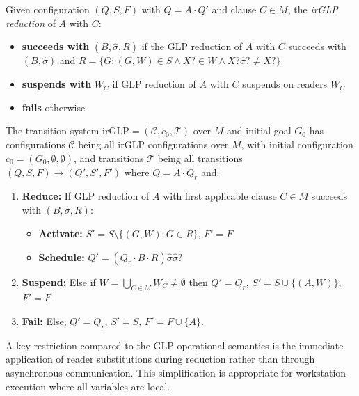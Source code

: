 \documentclass[runningheads,thm-restate]{llncs}
\begin{document}
\begin{definition}
Given configuration $(Q, S, F)$ with $Q = A\cdot Q'$ and clause $C \in M$, the \emph{irGLP reduction} of $A$ with $C$:
\begin{itemize}
\item \textbf{succeeds with} $(B, \hat\sigma, R)$ if the GLP reduction of $A$ with $C$ succeeds with $(B, \hat\sigma)$ and $R = \{G : (G, W) \in S \wedge X?\in W \wedge X?\hat\sigma? \neq X?\}$
\item \textbf{suspends with} $W_C$ if GLP reduction of $A$ with $C$ suspends on readers $W_C$
\item \textbf{fails} otherwise
\end{itemize}
\end{definition}

\begin{definition}
The transition system $\text{irGLP} = (\mathcal{C}, c_0, \mathcal{T})$ over $M$ and initial goal $G_0$ has configurations $\mathcal{C}$ being all irGLP configurations over $M$, with initial configuration $c_0 = (G_0, \emptyset, \emptyset)$, and transitions $\mathcal{T}$ being all transitions $(Q, S, F) \rightarrow (Q', S', F')$ where $Q = A \cdot Q_r$ and:
    \begin{enumerate}
    \item \textbf{Reduce:} If GLP reduction of $A$ with first applicable clause $C \in M$ succeeds with $(B, \hat\sigma,R)$:
        \begin{itemize}
        \item \textbf{Activate:}  $S' = S \setminus \{(G, W) : G \in R\}$,  $F' = F$
        \item \textbf{Schedule:} $Q' = (Q_r \cdot B \cdot R)\hat\sigma\hat\sigma?$
        \end{itemize}
    \item \textbf{Suspend:} Else if $W = \bigcup_{C \in M} W_{C} \neq \emptyset$ then $Q' = Q_r$, $S' = S \cup \{(A, W)\}$, $F' = F$
    \item \textbf{Fail:} Else,  $Q' = Q_r$, $S' = S$, $F' = F \cup \{A\}$.
    \end{enumerate}
\end{definition}

A key restriction compared to the GLP operational semantics is the immediate application of reader substitutions during reduction rather than through asynchronous communication. This simplification is appropriate for workstation execution where all variables are local.
\end{document}

